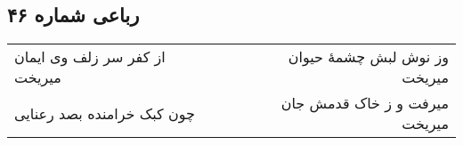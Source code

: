 \begin{center}
\section*{رباعی شماره ۴۶}
\label{sec:sh046}
\begin{longtable}{l p{0.5cm} r}
از کفر سر زلف وی ایمان میریخت
&&
وز نوش لبش چشمهٔ حیوان میریخت
\\
چون کبک خرامنده بصد رعنایی
&&
میرفت و ز خاک قدمش جان میریخت
\\
\end{longtable}
\end{center}
